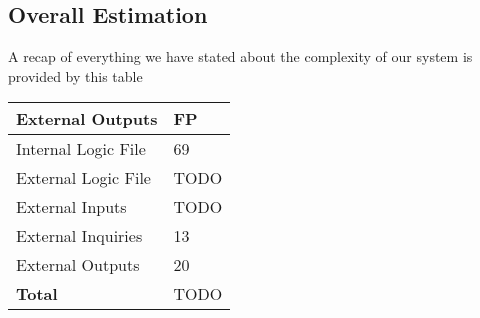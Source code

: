 \subsection{Overall Estimation}
A recap of everything we have stated about the complexity of our system is provided by this table
\begin{tabular}{|l|l|}
\hline
\textbf{External Outputs} & \textbf{FP} \\
\hline

Internal Logic File & 69\\
External Logic File & TODO\\
External Inputs & TODO\\
External Inquiries & 13\\
External Outputs & 20\\
\hline
\textbf{Total}} & TODO\\
\hline
\end{tabular}